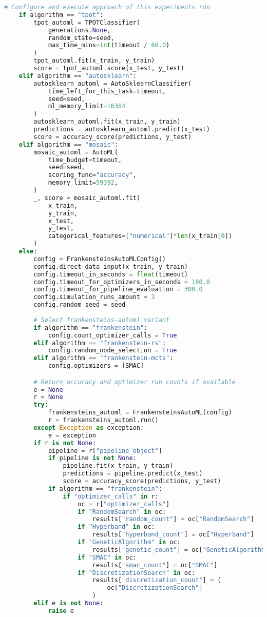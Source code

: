 \begin{lstlisting}[language=Python]
    # Configure and execute approach of this experiments run
    if algorithm == "tpot":
        tpot_automl = TPOTClassifier(
            generations=None,
            random_state=seed,
            max_time_mins=int(timeout / 60.0)
        )
        tpot_automl.fit(x_train, y_train)
        score = tpot_automl.score(x_test, y_test)
    elif algorithm == "autosklearn":
        autosklearn_automl = AutoSklearnClassifier(
            time_left_for_this_task=timeout,
            seed=seed,
            ml_memory_limit=16384
        )
        autosklearn_automl.fit(x_train, y_train)
        predictions = autosklearn_automl.predict(x_test)
        score = accuracy_score(predictions, y_test)
    elif algorithm == "mosaic":
        mosaic_automl = AutoML(
            time_budget=timeout,
            seed=seed,
            scoring_func="accuracy",
            memory_limit=59392,
        )
        _, score = mosaic_automl.fit(
            x_train,
            y_train,
            x_test,
            y_test,
            categorical_features=["numerical"]*len(x_train[0])
        )
    else:
        config = FrankensteinsAutoMLConfig()
        config.direct_data_input(x_train, y_train)
        config.timeout_in_seconds = float(timeout)
        config.timeout_for_optimizers_in_seconds = 180.0
        config.timeout_for_pipeline_evaluation = 300.0
        config.simulation_runs_amount = 3
        config.random_seed = seed
        
        # Select frankensteins-automl variant
        if algorithm == "frankenstein":
            config.count_optimizer_calls = True
        elif algorithm == "frankenstein-rs":
            config.random_node_selection = True
        elif algorithm == "frankenstein-mcts":
            config.optimizers = [SMAC]

        # Return accuracy and optimizer run counts if available
        e = None
        r = None
        try:
            frankensteins_automl = FrankensteinsAutoML(config)
            r = frankensteins_automl.run()
        except Exception as exception:
            e = exception
        if r is not None:
            pipeline = r["pipeline_object"]
            if pipeline is not None:
                pipeline.fit(x_train, y_train)
                predictions = pipeline.predict(x_test)
                score = accuracy_score(predictions, y_test)
            if algorithm == "frankenstein":
                if "optimizer_calls" in r:
                    oc = r["optimizer_calls"]
                    if "RandomSearch" in oc:
                        results["random_count"] = oc["RandomSearch"]
                    if "Hyperband" in oc:
                        results["hyperband_count"] = oc["Hyperband"]
                    if "GeneticAlgorithm" in oc:
                        results["genetic_count"] = oc["GeneticAlgorithm"]
                    if "SMAC" in oc:
                        results["smac_count"] = oc["SMAC"]
                    if "DiscretizationSearch" in oc:
                        results["discretization_count"] = (
                            oc["DiscretizationSearch"]
                        )
        elif e is not None:
            raise e


\end{lstlisting}
